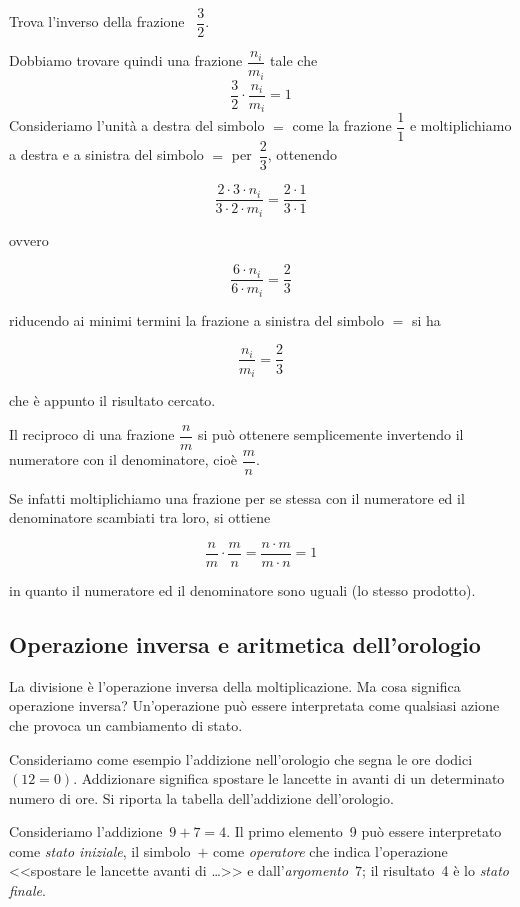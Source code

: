 \begin{exrig}
\begin{esempio}
Trova l'inverso della frazione ~$\dfrac{3}{2}$.

Dobbiamo trovare quindi una frazione $\dfrac{n_i}{m_i}$ tale che
\[\frac{3}{2} \cdot \frac{n_i}{m_i} =1\]
Consideriamo l'unità a destra del simbolo $=$ come la frazione $\dfrac{1}{1}$ e moltiplichiamo a destra e a sinistra del simbolo $=$ per~$\dfrac{2}{3}$, ottenendo

\[\frac{2\cdot 3 \cdot n_i}{3\cdot 2 \cdot m_i} = \frac{2\cdot 1}{3\cdot 1}\]

\noindent ovvero

\[\frac{6 \cdot n_i}{6 \cdot m_i} = \frac{2}{3}\]

\noindent riducendo ai minimi termini la frazione a sinistra del simbolo $=$ si ha

\[\frac{n_i}{m_i} = \frac{2}{3}\]

\noindent che è appunto il risultato cercato.
\end{esempio}
\end{exrig}

\osservazione Il reciproco di una frazione $\dfrac{n}{m}$ si può ottenere semplicemente invertendo il numeratore con il denominatore, cioè $\dfrac{m}{n}$.

Se infatti moltiplichiamo una frazione per se stessa con il numeratore ed il denominatore scambiati tra loro, si ottiene

\[\frac{n}{m} \cdot \frac{m}{n} = \frac{n \cdot m}{m \cdot n} = 1\]

\noindent in quanto il numeratore ed il denominatore sono uguali (lo stesso prodotto).

\subsection{Operazione inversa e aritmetica dell'orologio}

La divisione è l'operazione inversa della moltiplicazione. Ma cosa significa operazione inversa?
Un'operazione può essere interpretata come qualsiasi azione che provoca un cambiamento di stato.

Consideriamo come esempio l'addizione nell'orologio che segna le ore dodici~$(12=0)$.
Addizionare significa spostare le lancette in avanti di un determinato numero di ore.
Si riporta la tabella dell'addizione dell'orologio.

Consideriamo l'addizione~$9+7=4$.
Il primo elemento~9 può essere interpretato come \emph{stato iniziale}, il simbolo~$+$ come \emph{operatore} che indica l'operazione
<<spostare le lancette avanti di \ldots>> e dall'\emph{argomento}~$7$; il risultato~4 è lo \emph{stato finale}.

